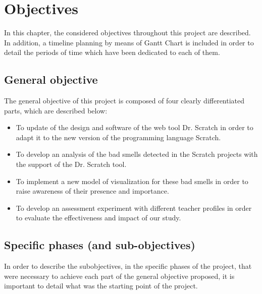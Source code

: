

\chapter{Objectives} 
\label{chap:objectives} 

In this chapter, the considered objectives throughout this project are described. In addition, a timeline planning by means of Gantt Chart is included in order to detail the periods of time which have been dedicated to each of them.

\section{General objective}
\label{sec:general-objective}

The general objective of this project is composed of four clearly differentiated parts, which are described below:

\begin{itemize}
    \item To update of the design and software of the web tool Dr. Scratch in order to adapt it to the new version of the programming language Scratch. 
    \item To develop an analysis of the bad smells detected in the Scratch projects with the support of the Dr. Scratch tool. 
    \item To implement a new model of visualization for these bad smells in order to raise awareness of their presence and importance. 
    \item To develop an assessment experiment with different teacher profiles in order to evaluate the effectiveness and impact of our study.
\end{itemize}


\section{Specific phases (and sub-objectives)}
\label{sec:specific-objectives}

In order to describe the subobjectives, in the specific phases of the project, that were necessary to achieve each part of the general objective proposed, it is important to detail what was the starting point of the project. 

